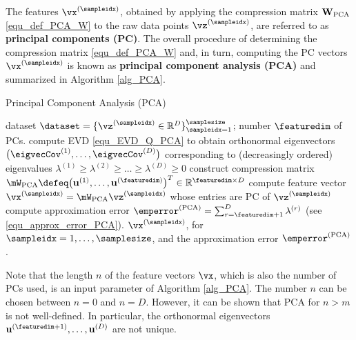\documentclass[12pt]{report}
\begin{document}
The features $\vx^{(\sampleidx)}$, obtained by applying the compression matrix $\mathbf{W}_{\rm PCA}$ 
\eqref{equ_def_PCA_W} to the raw data points $\vz^{(\sampleidx)}$, are referred to as {\bf principal components (PC)}. 
The overall procedure of determining the compression matrix \eqref{equ_def_PCA_W} and, in turn, computing 
the PC vectors $\vx^{(\sampleidx)}$ is known as {\bf principal component analysis (PCA)} and summarized 
in Algorithm \ref{alg_PCA}. 
\begin{algorithm}[htbp]
\caption{Principal Component Analysis (PCA)}\label{alg_PCA}
\begin{algorithmic}[1]
\renewcommand{\algorithmicrequire}{\textbf{Input:}}
\renewcommand{\algorithmicensure}{\textbf{Output:}}
\Require  dataset  $\dataset=\{ \vz^{(\sampleidx)} \in \mathbb{R}^{D} \}_{\sampleidx=1}^{\samplesize}$; number $\featuredim$ of PCs. 
\State compute EVD \eqref{equ_EVD_Q_PCA} to obtain orthonormal eigenvectors $\big(\eigvecCov^{(1)},\ldots,\eigvecCov^{(D)}\big)$ 
corresponding to (decreasingly ordered) eigenvalues $\lambda^{(1)} \geq \lambda^{(2)}\geq \ldots \geq \lambda^{(D)} \geq 0$
\vspace*{2mm}
\State construct compression matrix $\mW_{\rm PCA}  \defeq \big( \mathbf{u}^{(1)},\ldots, \mathbf{u}^{(\featuredim)} \big)^{T} \in \mathbb{R}^{\featuredim \times D}$ %
\vspace*{2mm}
\State compute feature vector $\vx^{(\sampleidx)} = \mW_{\rm PCA} \vz^{(\sampleidx)}$ whose entries are PC of $\vz^{(\sampleidx)}$ %
\vspace*{2mm}
\State compute approximation error $\emperror^{(\rm PCA)} = \sum_{r = \featuredim+1}^{D} \lambda^{(r)}$ (see \eqref{equ_approx_error_PCA}). 
\vspace*{2mm}
\Ensure $\vx^{(\sampleidx)}$, for $\sampleidx=1,\ldots,\samplesize$, and the approximation error $\emperror^{(\rm PCA)}$. 
\end{algorithmic}
\end{algorithm}
Note that the length $n$ of the feature vectors $\vx$, which is also the number of PCs used, is an 
input parameter of Algorithm \ref{alg_PCA}. The number $n$ can be chosen between $n=0$ and $n=D$. 
However, it can be shown that PCA for $n>m$ is not well-defined. In particular, the orthonormal eigenvectors 
$ \mathbf{u}^{(\featuredim+1)},\ldots, \mathbf{u}^{(D)}$ are not unique. 
\end{document}
